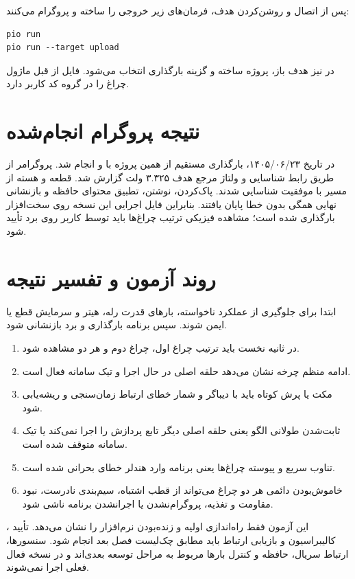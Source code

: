 پس از اتصال
و روشن‌کردن هدف، فرمان‌های زیر خروجی را ساخته و پروگرام می‌کنند:

\begin{LTR}
\begin{verbatim}
pio run
pio run --target upload
\end{verbatim}
\end{LTR}

در
نیز هدف
باز، پروژه ساخته و گزینه بارگذاری انتخاب می‌شود. فایل
از قبل ماژول چراغ را در گروه کد کاربر دارد.

\section{نتیجه پروگرام انجام‌شده}
در تاریخ ۱۴۰۵/۰۶/۲۳، بارگذاری مستقیم از همین پروژه با
و
انجام شد. پروگرامر از طریق رابط
شناسایی و ولتاژ مرجع هدف ۳.۳۲۵ ولت گزارش شد. قطعه
و هسته
از مسیر
با موفقیت شناسایی شدند. پاک‌کردن، نوشتن، تطبیق محتوای حافظه و بازنشانی نهایی همگی بدون خطا پایان یافتند. بنابراین فایل اجرایی این نسخه روی سخت‌افزار بارگذاری شده است؛ مشاهده فیزیکی ترتیب چراغ‌ها باید توسط کاربر روی برد تأیید شود.

\section{روند آزمون و تفسیر نتیجه}
ابتدا برای جلوگیری از عملکرد ناخواسته، بارهای قدرت رله، هیتر و سرمایش قطع یا ایمن شوند. سپس برنامه بارگذاری و برد بازنشانی شود.

\begin{enumerate}
  \item در ثانیه نخست باید ترتیب چراغ اول، چراغ دوم و هر دو مشاهده شود.
  \item ادامه منظم چرخه نشان می‌دهد حلقه اصلی در حال اجرا و تیک سامانه فعال است.
  \item مکث یا پرش کوتاه باید با دیباگر و شمار خطای ارتباط  زمان‌سنجی و ریشه‌یابی شود.
  \item ثابت‌شدن طولانی الگو یعنی حلقه اصلی دیگر تابع پردازش را اجرا نمی‌کند یا تیک سامانه متوقف شده است.
  \item تناوب سریع و پیوسته چراغ‌ها یعنی برنامه وارد هندلر خطای بحرانی شده است.
  \item خاموش‌بودن دائمی هر دو چراغ می‌تواند از قطب اشتباه، سیم‌بندی نادرست، نبود مقاومت و تغذیه، پروگرام‌نشدن یا اجرا‌نشدن برنامه ناشی شود.
\end{enumerate}

این آزمون فقط راه‌اندازی اولیه و زنده‌بودن نرم‌افزار را نشان می‌دهد. تأیید ، کالیبراسیون و بازیابی ارتباط باید مطابق چک‌لیست فصل بعد انجام شود. سنسورها، ارتباط سریال، حافظه و کنترل بارها مربوط به مراحل توسعه بعدی‌اند و در نسخه فعال فعلی اجرا نمی‌شوند.
